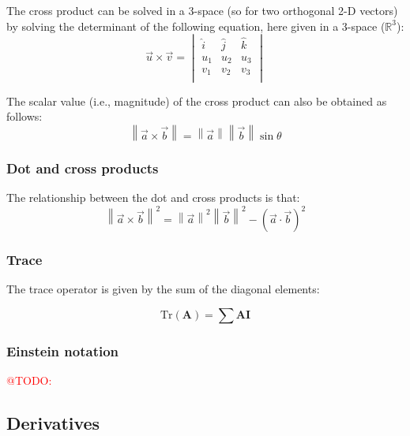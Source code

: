 \documentclass[a4paper,10pt]{scrartcl}
\makeatletter
\newcommand{\todo}[1]{\textcolor{red}{@TODO: #1}}
\makeatother
\begin{document}
The cross product can be solved in a 3-space (so for two orthogonal 2-D vectors) by solving the determinant of the following equation, here given in a 3-space ($\mathbb{R}^3$):
\begin{equation}
\vec{u} \times \vec{v} =
\begin{vmatrix}
  \hat{i}	&	\hat{j}	&	\hat{k}\\
  u_1		&	u_2	&	u_3\\
  v_1		&	v_2	&	v_3\\
\end{vmatrix}
\end{equation}


The scalar value (i.e., magnitude) of the cross product can also be obtained as follows:
\begin{equation}
\left\| \vec{a} \times \vec{b} \right\| = \left\| \vec{a} \right\| \left\| \vec{b} \right\| \sin \theta
\end{equation}

\subsubsection{Dot and cross products}

The relationship between the dot and cross products is that:
\begin{equation}
 \left\| \vec{a} \times \vec{b} \right\|^2  = \left\| \vec{a}\right\|^2  \left\|\vec{b}\right\|^2 - (\vec{a} \cdot \vec{b})^2
\end{equation}



\subsubsection{Trace}

The trace operator is given by the sum of the diagonal elements:

\begin{equation}
 \text{Tr}\left(\mathbf{A}\right) = \sum \mathbf{A} \mathbf{I}
\end{equation}


\subsubsection{Einstein notation}

\todo{}

\subsection{Derivatives}
\end{document}
